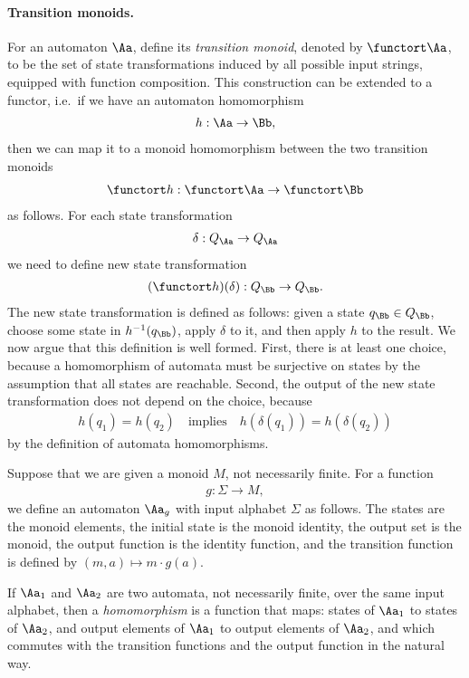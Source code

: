 \paragraph*{Transition monoids.} 
For an automaton $\Aa$, define its \emph{transition monoid}, denoted by $\functort  \Aa$,  to be the set of state transformations induced by all possible input strings, equipped with function composition. This construction can be extended to a functor, i.e.~if we have an automaton homomorphism 
\begin{align*}
h : \Aa \to \Bb,
\end{align*}
then we can map it to a monoid homomorphism between the two transition monoids
\begin{align*}
\functort h : \functort \Aa \to \functort \Bb
\end{align*}
as follows. For each  state transformation 
\begin{align*}
\delta : Q_\Aa \to Q_\Aa
\end{align*}
we need to define new state transformation 
\begin{align*}
(\functort h)(\delta) : Q_\Bb \to Q_\Bb.
\end{align*}
The new state transformation is defined as follows: given a state $q_\Bb \in Q_{\Bb}$, choose some state in  $h^{-1}(q_\Bb)$, apply $\delta$ to it, and then apply $h$ to the result. We now argue that this definition is well formed. First, there is at least one choice, because a homomorphism of automata must be surjective on states by the assumption that all states are reachable.  Second, the output of the new state transformation does not depend on the choice, because 
\begin{align*}
h(q_1) = h(q_2) 
\quad \text{implies} \quad 
h(\delta(q_1))= h(\delta(q_2))
\end{align*}
by the definition of automata homomorphisms.


Suppose that we are given a monoid $M$, not necessarily finite. For a function 
\begin{align*}
g : \Sigma \to M,
\end{align*}
we define an automaton $\Aa_g$ with input alphabet $\Sigma$ as follows. The states are the monoid elements, the initial state is the monoid identity, the output set is the monoid, the output function is the identity function, and the transition function is defined by $(m,a) \mapsto m \cdot g(a)$. 

If $\Aa_1$ and $\Aa_2$ are two automata, not necessarily finite, over the same input alphabet, then a \emph{homomorphism} is a function that maps: states of $\Aa_1$ to states of $\Aa_2$, and output elements of $\Aa_1$ to output elements of $\Aa_2$, and which commutes with the transition functions and the output function in the natural way. 